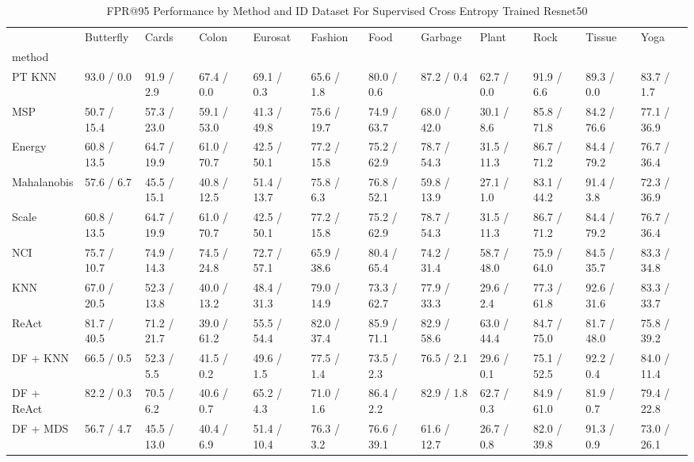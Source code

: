\documentclass[letterpaper]{article} %
\theoremstyle{plain}
\theoremstyle{definition}
\theoremstyle{remark}
\begin{document}
\begin{table}
\caption{FPR@95 Performance by Method and ID Dataset For Supervised Cross Entropy Trained Resnet50}

\label{tab:fpr95_results_resnet}
\begin{tabular}{llllllllllll}
\toprule
  & Butterfly & Cards & Colon & Eurosat & Fashion & Food & Garbage & Plant & Rock & Tissue & Yoga \\
method &  &  &  &  &  &  &  &  &  &  &  \\
\midrule
PT KNN & 93.0 / 0.0 & 91.9 / 2.9 & 67.4 / 0.0 & 69.1 / 0.3 & 65.6 / 1.8 & 80.0 / 0.6 & 87.2 / 0.4 & 62.7 / 0.0 & 91.9 / 6.6 & 89.3 / 0.0 & 83.7 / 1.7 \\
MSP & 50.7 / 15.4 & 57.3 / 23.0 & 59.1 / 53.0 & 41.3 / 49.8 & 75.6 / 19.7 & 74.9 / 63.7 & 68.0 / 42.0 & 30.1 / 8.6 & 85.8 / 71.8 & 84.2 / 76.6 & 77.1 / 36.9 \\
Energy & 60.8 / 13.5 & 64.7 / 19.9 & 61.0 / 70.7 & 42.5 / 50.1 & 77.2 / 15.8 & 75.2 / 62.9 & 78.7 / 54.3 & 31.5 / 11.3 & 86.7 / 71.2 & 84.4 / 79.2 & 76.7 / 36.4 \\
Mahalanobis & 57.6 / 6.7 & 45.5 / 15.1 & 40.8 / 12.5 & 51.4 / 13.7 & 75.8 / 6.3 & 76.8 / 52.1 & 59.8 / 13.9 & 27.1 / 1.0 & 83.1 / 44.2 & 91.4 / 3.8 & 72.3 / 36.9 \\
Scale & 60.8 / 13.5 & 64.7 / 19.9 & 61.0 / 70.7 & 42.5 / 50.1 & 77.2 / 15.8 & 75.2 / 62.9 & 78.7 / 54.3 & 31.5 / 11.3 & 86.7 / 71.2 & 84.4 / 79.2 & 76.7 / 36.4 \\
NCI & 75.7 / 10.7 & 74.9 / 14.3 & 74.5 / 24.8 & 72.7 / 57.1 & 65.9 / 38.6 & 80.4 / 65.4 & 74.2 / 31.4 & 58.7 / 48.0 & 75.9 / 64.0 & 84.5 / 35.7 & 83.3 / 34.8 \\
KNN & 67.0 / 20.5 & 52.3 / 13.8 & 40.0 / 13.2 & 48.4 / 31.3 & 79.0 / 14.9 & 73.3 / 62.7 & 77.9 / 33.3 & 29.6 / 2.4 & 77.3 / 61.8 & 92.6 / 31.6 & 83.3 / 33.7 \\
ReAct & 81.7 / 40.5 & 71.2 / 21.7 & 39.0 / 61.2 & 55.5 / 54.4 & 82.0 / 37.4 & 85.9 / 71.1 & 82.9 / 58.6 & 63.0 / 44.4 & 84.7 / 75.0 & 81.7 / 48.0 & 75.8 / 39.2 \\
DF + KNN & 66.5 / 0.5 & 52.3 / 5.5 & 41.5 / 0.2 & 49.6 / 1.5 & 77.5 / 1.4 & 73.5 / 2.3 & 76.5 / 2.1 & 29.6 / 0.1 & 75.1 / 52.5 & 92.2 / 0.4 & 84.0 / 11.4 \\
DF + ReAct & 82.2 / 0.3 & 70.5 / 6.2 & 40.6 / 0.7 & 65.2 / 4.3 & 71.0 / 1.6 & 86.4 / 2.2 & 82.9 / 1.8 & 62.7 / 0.3 & 84.9 / 61.0 & 81.9 / 0.7 & 79.4 / 22.8 \\
DF + MDS & 56.7 / 4.7 & 45.5 / 13.0 & 40.4 / 6.9 & 51.4 / 10.4 & 76.3 / 3.2 & 76.6 / 39.1 & 61.6 / 12.7 & 26.7 / 0.8 & 82.0 / 39.8 & 91.3 / 0.9 & 73.0 / 26.1 \\
\bottomrule
\end{tabular}

\end{table}
\end{document}
